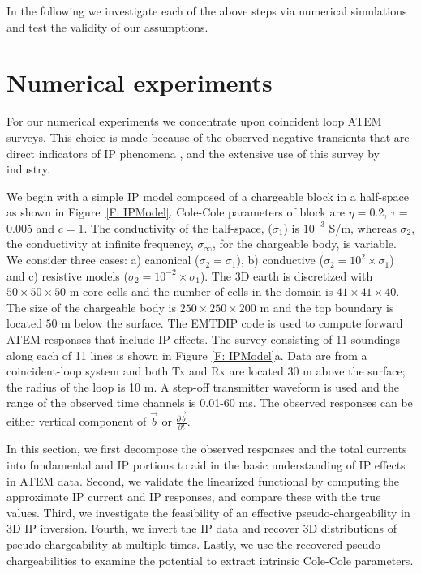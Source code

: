 \documentclass[extra,mreferee]{gji}
\newcommand{\siginf}{\sigma_\infty}
\renewcommand {\b}  { {\vec b} }
\begin{document}
In the following we investigate each of the above steps via numerical simulations and test the validity of our assumptions. 


\section{Numerical experiments}
\label{section: numerical_examples}
For our numerical experiments we concentrate upon coincident loop ATEM surveys. This choice is made because of the observed negative transients that are direct indicators of IP phenomena \cite[]{Kratzer2012,Kang2015a,Kang2015b}, and the extensive  use of this survey  by industry.  

We begin with a simple IP model composed of  a chargeable block in a half-space as shown in Figure~\ref{F: IPModel}.
Cole-Cole parameters of block are  $\eta=$0.2, $\tau=$0.005 and $c=$1.
The conductivity  of the half-space, ($\sigma_1$) is  $10^{-3}$ S/m, whereas $\sigma_2$, 
the conductivity at infinite frequency, $\siginf$,  for the chargeable body, is variable.  
We consider three cases: a) canonical ($\sigma_2=\sigma_1$), b) conductive ($\sigma_2=10^2\times\sigma_1$) and c) resistive models ($\sigma_2=10^{-2}\times\sigma_1$).
The 3D earth is discretized with  $50\times50\times50$ m core cells and the number of cells in the domain is $41\times41\times40$.
The size of the chargeable body is $250\times250\times200$ m and the top boundary is located  $50$ m below the surface.
The EMTDIP code \cite[]{Marchant2014} is used to compute forward ATEM responses that include IP effects. The survey consisting of 11 soundings along each of 11 lines is shown in Figure \ref{F: IPModel}a.
Data are from a  coincident-loop system and both Tx and Rx are located 30 m above the surface; the radius of the loop is 10 m.
A step-off transmitter waveform is used and the range of the observed time channels is 0.01-60 ms. The observed responses can be either vertical component of $\b$ or $\frac{\partial \b}{\partial t}$.

In this section, we first decompose the observed responses and the total currents into fundamental and IP portions to aid in the basic understanding of IP effects in ATEM data. 
Second, we validate the linearized functional by computing the approximate IP current and IP responses, and compare these  with the true values. 
Third, we investigate the feasibility of an effective pseudo-chargeability in 3D IP inversion. 
Fourth, we invert the IP data and recover 3D distributions of pseudo-chargeability at multiple times.  Lastly, we use the recovered pseudo-chargeabilities to examine the potential to extract intrinsic Cole-Cole parameters. 
\end{document}
